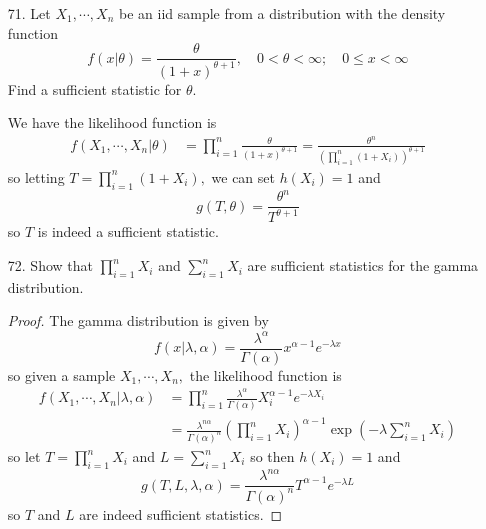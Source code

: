 \documentclass{article}
\begin{document}
\begin{itemize}
\begin{soln}
		\end{soln}

	\item[71.] Let $X_1, \cdots, X_n$ be an iid sample from a distribution with the density function \[f(x|\theta)=\frac{\theta}{(1+x)^{\theta+1}}, \quad 0<\theta<\infty; \quad 0\le x<\infty\] Find a sufficient statistic for $\theta.$
		\begin{soln}
			We have the likelihood function is
			\begin{align*}
				f(X_1,\cdots, X_n|\theta) &= \prod_{i=1}^n \frac{\theta}{(1+x)^{\theta+1}} = \frac{\theta^n}{\left( \displaystyle\prod_{i=1}^n (1+X_i) \right)^{\theta+1}}
			\end{align*} so letting $T=\displaystyle\prod_{i=1}^n (1+X_i),$ we can set $h(X_i)=1$ and \[g(T, \theta) = \frac{\theta^n}{T^{\theta+1}}\] so $T$ is indeed a sufficient statistic.
			
		\end{soln}

	\item[72.] Show that $\displaystyle \prod_{i=1}^n X_i$ and $\displaystyle\sum_{i=1}^{n} X_i$ are sufficient statistics for the gamma distribution.
		\begin{proof}
			The gamma distribution is given by \[f(x|\lambda, \alpha)=\frac{\lambda^\alpha}{\Gamma(\alpha)}x^{\alpha-1} e^{-\lambda x}\] so given a sample $X_1, \cdots, X_n,$ the likelihood function is 
			\begin{align*}
				f(X_1, \cdots, X_n|\lambda, \alpha) &= \prod_{i=1}^n \frac{\lambda^\alpha}{\Gamma(\alpha)}X_i^{\alpha-1} e^{-\lambda X_i} \\
				&= \frac{\lambda^{n\alpha}}{\Gamma(\alpha)^n}\left( \prod_{i=1}^n X_i \right)^{\alpha-1} \exp{\left( -\lambda \sum_{i=1}^{n} X_i \right)}
			\end{align*} so let $T=\displaystyle\prod_{i=1}^n X_i$ and $L=\displaystyle\sum_{i=1}^{n} X_i$ so then $h(X_i)=1$ and \[g(T, L, \lambda, \alpha) = \frac{\lambda^{n\alpha}}{\Gamma(\alpha)^n} T^{\alpha-1} e^{-\lambda L}\] so $T$ and $L$ are indeed sufficient statistics.
			
		\end{proof}

\end{itemize}
\end{document}
